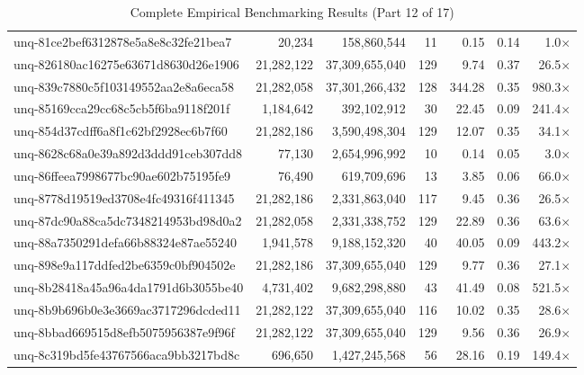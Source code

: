 \begin{table}[h!]
\begin{tabular}{lrrrrrr}
unq-81ce2bef6312878e5a8e8c32fe21bea7 & 20,234 & 158,860,544 & 11 & 0.15 & 0.14 & 1.0$\times$ \\
unq-826180ac16275e63671d8630d26e1906 & 21,282,122 & 37,309,655,040 & 129 & 9.74 & 0.37 & 26.5$\times$ \\
unq-839c7880c5f103149552aa2e8a6eca58 & 21,282,058 & 37,301,266,432 & 128 & 344.28 & 0.35 & 980.3$\times$ \\
unq-85169cca29cc68c5cb5f6ba9118f201f & 1,184,642 & 392,102,912 & 30 & 22.45 & 0.09 & 241.4$\times$ \\
unq-854d37cdff6a8f1c62bf2928ec6b7f60 & 21,282,186 & 3,590,498,304 & 129 & 12.07 & 0.35 & 34.1$\times$ \\
unq-8628c68a0e39a892d3ddd91ceb307dd8 & 77,130 & 2,654,996,992 & 10 & 0.14 & 0.05 & 3.0$\times$ \\
unq-86ffeea7998677bc90ae602b75195fe9 & 76,490 & 619,709,696 & 13 & 3.85 & 0.06 & 66.0$\times$ \\
unq-8778d19519ed3708e4fc49316f411345 & 21,282,186 & 2,331,863,040 & 117 & 9.45 & 0.36 & 26.5$\times$ \\
unq-87dc90a88ca5dc7348214953bd98d0a2 & 21,282,058 & 2,331,338,752 & 129 & 22.89 & 0.36 & 63.6$\times$ \\
unq-88a7350291defa66b88324e87ae55240 & 1,941,578 & 9,188,152,320 & 40 & 40.05 & 0.09 & 443.2$\times$ \\
unq-898e9a117ddfed2be6359c0bf904502e & 21,282,186 & 37,309,655,040 & 129 & 9.77 & 0.36 & 27.1$\times$ \\
unq-8b28418a45a96a4da1791d6b3055be40 & 4,731,402 & 9,682,298,880 & 43 & 41.49 & 0.08 & 521.5$\times$ \\
unq-8b9b696b0e3e3669ac3717296dcded11 & 21,282,122 & 37,309,655,040 & 116 & 10.02 & 0.35 & 28.6$\times$ \\
unq-8bbad669515d8efb5075956387e9f96f & 21,282,122 & 37,309,655,040 & 129 & 9.56 & 0.36 & 26.9$\times$ \\
unq-8c319bd5fe43767566aca9bb3217bd8c & 696,650 & 1,427,245,568 & 56 & 28.16 & 0.19 & 149.4$\times$ \\
\bottomrule
\end{tabular}
\caption{Complete Empirical Benchmarking Results (Part 12 of 17)}
\end{table}

\clearpage

